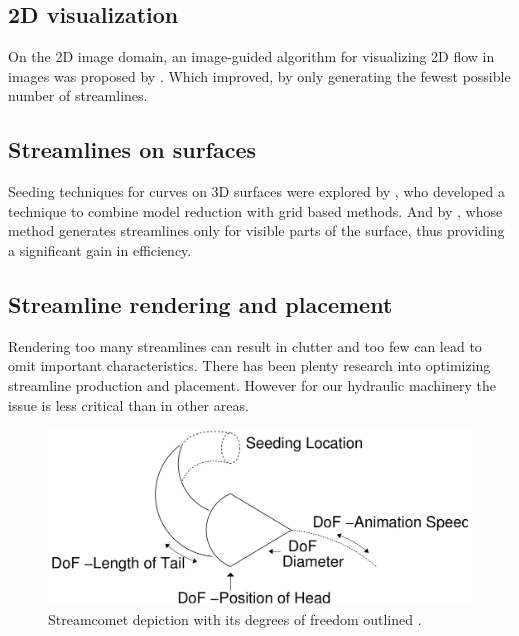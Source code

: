 \subsection{2D visualization}

On the 2D image domain, an image-guided algorithm for visualizing 2D flow in images was proposed by \cite{Turk1996}.
Which \cite{Li2008} improved, by only generating the fewest possible number of streamlines. 

\subsection{Streamlines on surfaces}

Seeding techniques for curves on 3D surfaces were explored by  \cite{Wicke2009}, who developed a technique to combine model reduction with grid based methods.
And by \cite{Spencer2009}, whose method generates streamlines only for visible parts of the surface, thus providing a significant gain in efficiency.

\subsection{Streamline rendering and placement}

Rendering too many streamlines can result in clutter and too few can lead to omit important characteristics.
There has been plenty research into optimizing streamline production and placement.
However for our hydraulic machinery the issue is less critical than in other areas.

\begin{figure}
	\centering
	\includegraphics[scale=.2]{images/streamComet}
	\caption{Streamcomet depiction with its degrees of freedom outlined \cite{Laramee2005}.}
	\label{fig:streamComent}
\end{figure}

